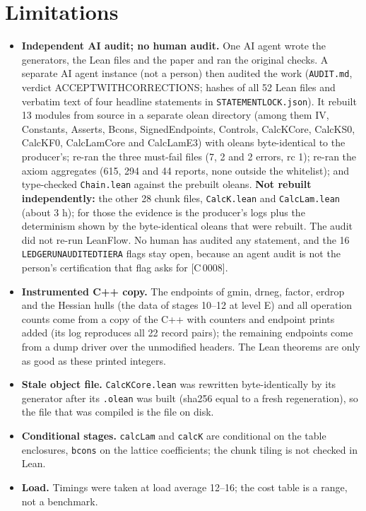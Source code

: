 \documentclass[10pt]{article}
\newcommand{\tg}[2]{\texorpdfstring{\textsf{[#1\,#2]}}{}}  %
\newcommand{\lean}[1]{\texttt{#1}}
\renewcommand{\_}{\textunderscore\allowbreak}
\begin{document}
\section{Limitations}\label{sec:lim}
\begin{itemize}
\item \textbf{Independent AI audit; no human audit.} One AI agent wrote the generators, the Lean files and the paper and ran the original checks. A separate AI agent instance (not a person) then audited the work (\texttt{AUDIT.md}, verdict ACCEPT\_WITH\_CORRECTIONS; hashes of all 52 Lean files and verbatim text of four headline statements in \texttt{STATEMENT\_LOCK.json}). It rebuilt 13 modules from source in a separate olean directory (among them IV, Constants, Asserts, Bcons, SignedEndpoints, Controls, CalcKCore, CalcKS0, CalcKF0, CalcLamCore and CalcLamE3) with oleans byte-identical to the producer's; re-ran the three must-fail files (7, 2 and 2 errors, rc 1); re-ran the axiom aggregates (615, 294 and 44 reports, none outside the whitelist); and type-checked \texttt{Chain.lean} against the prebuilt oleans. \textbf{Not rebuilt independently:} the other 28 chunk files, \texttt{CalcK.lean} and \texttt{CalcLam.lean} (about 3 h); for those the evidence is the producer's logs plus the determinism shown by the byte-identical oleans that were rebuilt. The audit did not re-run LeanFlow. No human has audited any statement, and the 16 \texttt{LEDGER\_UNAUDITED\_TIER\_A} flags stay open, because an agent audit is not the person's certification that flag asks for \tg{C}{0008}.
\item \textbf{Instrumented C++ copy.} The endpoints of gmin, drneg, factor, er\_drop and the Hessian hulls (the data of stages 10--12 at level E) and all operation counts come from a copy of the C++ with counters and endpoint prints added (its log reproduces all 22 record pairs); the remaining endpoints come from a dump driver over the unmodified headers. The Lean theorems are only as good as these printed integers.
\item \textbf{Stale object file.} \texttt{CalcKCore.lean} was rewritten byte-identically by its generator after its \texttt{.olean} was built (sha256 equal to a fresh regeneration), so the file that was compiled is the file on disk.
\item \textbf{Conditional stages.} \lean{calcLam} and \lean{calcK} are conditional on the table enclosures, \lean{bcons} on the lattice coefficients; the chunk tiling is not checked in Lean.
\item \textbf{Load.} Timings were taken at load average 12--16; the cost table is a range, not a benchmark.

\end{itemize}
\end{document}
